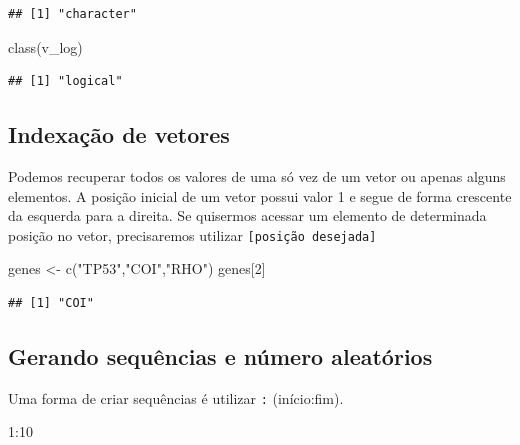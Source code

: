 \documentclass[
]{book}
\newenvironment{Shaded}{\begin{snugshade}}{\end{snugshade}}
\newcommand{\DecValTok}[1]{\textcolor[rgb]{0.00,0.00,0.81}{#1}}
\newcommand{\FunctionTok}[1]{\textcolor[rgb]{0.00,0.00,0.00}{#1}}
\newcommand{\NormalTok}[1]{#1}
\newcommand{\OtherTok}[1]{\textcolor[rgb]{0.56,0.35,0.01}{#1}}
\newcommand{\SpecialCharTok}[1]{\textcolor[rgb]{0.00,0.00,0.00}{#1}}
\newcommand{\StringTok}[1]{\textcolor[rgb]{0.31,0.60,0.02}{#1}}
\begin{document}
\begin{verbatim}
## [1] "character"
\end{verbatim}

\begin{Shaded}
\begin{Highlighting}[]
\FunctionTok{class}\NormalTok{(v\_log)}
\end{Highlighting}
\end{Shaded}

\begin{verbatim}
## [1] "logical"
\end{verbatim}

\hypertarget{indexauxe7uxe3o-de-vetores}{%
\subsection{Indexação de vetores}\label{indexauxe7uxe3o-de-vetores}}

Podemos recuperar todos os valores de uma só vez de um vetor ou apenas alguns elementos. A posição inicial de um vetor possui valor 1 e segue de forma crescente da esquerda para a direita. Se quisermos acessar um elemento de determinada posição no vetor, precisaremos utilizar \texttt{{[}posição\ desejada{]}}

\begin{Shaded}
\begin{Highlighting}[]
\NormalTok{genes }\OtherTok{\textless{}{-}} \FunctionTok{c}\NormalTok{(}\StringTok{"TP53"}\NormalTok{,}\StringTok{"COI"}\NormalTok{,}\StringTok{"RHO"}\NormalTok{)}
\NormalTok{genes[}\DecValTok{2}\NormalTok{]}
\end{Highlighting}
\end{Shaded}

\begin{verbatim}
## [1] "COI"
\end{verbatim}

\hypertarget{gerando-sequuxeancias-e-nuxfamero-aleatuxf3rios}{%
\subsection{Gerando sequências e número aleatórios}\label{gerando-sequuxeancias-e-nuxfamero-aleatuxf3rios}}

Uma forma de criar sequências é utilizar \texttt{:} (início:fim).

\begin{Shaded}
\begin{Highlighting}[]
\DecValTok{1}\SpecialCharTok{:}\DecValTok{10}
\end{Highlighting}
\end{Shaded}
\end{document}
